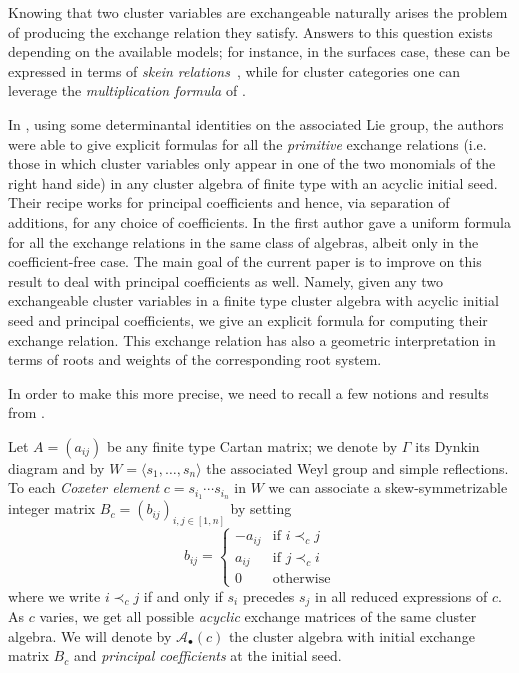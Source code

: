 \documentclass[pdftex]{sigma}
\numberwithin{equation}{section}
\numberwithin{figure}{section}
\newcommand{\cA}{\mathcal{A}}
\begin{document}
  Knowing that two cluster variables are exchangeable naturally arises the problem of producing the exchange relation they satisfy.
  Answers to this question exists depending on the available models; for instance, in the surfaces case, these can be expressed in terms of \emph{skein relations}~\cite{MW13, FeTu15}, while for cluster categories one can leverage the \emph{multiplication formula} of \cite{CK08}.

  In \cite{YZ08}, using some determinantal identities on the associated Lie group, the authors were able to give explicit formulas for all the \emph{primitive} exchange relations (i.e. those in which cluster variables only appear in one of the two monomials of the right hand side) in any cluster algebra of finite type with an acyclic initial seed.
  Their recipe works for principal coefficients and hence, via separation of additions, for any choice of coefficients.
  In \cite{Ste13} the first author gave a uniform formula for all the exchange relations in the same class of algebras, albeit only in the coefficient-free case.
  The main goal of the current paper is to improve on this result to deal with principal coefficients as well.
  Namely, given any two exchangeable cluster variables in a finite type cluster algebra with acyclic initial seed and principal coefficients, we give an explicit formula for computing their exchange relation.
  This exchange relation has also a geometric interpretation in terms of roots and weights of the corresponding root system.


  In order to make this more precise, we need to recall a few notions and results from \cite{Ste13,YZ08}.

  Let $A=(a_{ij})$ be any finite type Cartan matrix; we denote by $\Gamma$ its Dynkin diagram and by $W=\langle s_1,\dots,s_n\rangle$ the associated Weyl group and simple reflections.
  To each \emph{Coxeter element} $c=s_{i_1}\cdots s_{i_n}$ in $W$ we can associate a skew-symmetrizable integer matrix $B_c=(b_{ij})_{i,j\in[1,n]}$ by setting
  \[
    b_{ij}=
    \begin{cases}
      -a_{ij} & \text{if } i\prec_c j  \\
      a_{ij}  & \text{if } j\prec_c i  \\
      0       & \text{otherwise}
    \end{cases}
  \]
  where we write $i\prec_c j$ if and only if $s_i$ precedes $s_j$ in all reduced expressions of $c$.
  As $c$ varies, we get all possible \emph{acyclic} exchange matrices of the same cluster algebra.
  We will denote by $\cA_\bullet(c)$ the cluster algebra with initial exchange matrix $B_c$ and  \emph{principal coefficients} at the initial seed.
\end{document}
